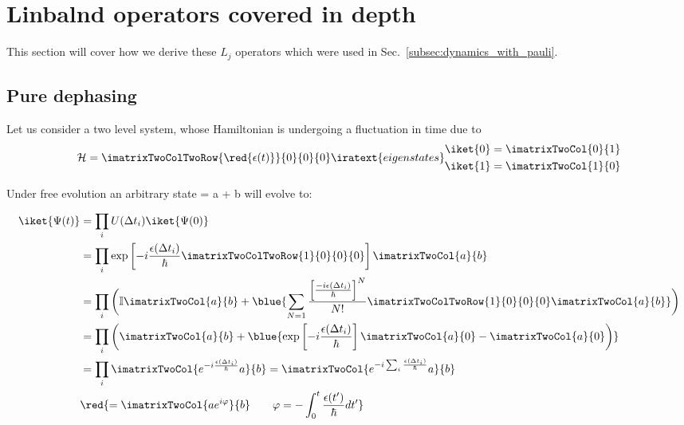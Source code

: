 
\section{Linbalnd operators covered in depth\label{sec:linbland2}}
This section  will cover how  we derive these  $ L_j $  operators which
were used in Sec.~\ref{subsec:dynamics_with_pauli}.
\subsection{Pure dephasing\label{sec:lin_1}}
Let us consider  a two level system, whose Hamiltonian  is undergoing a
fluctuation in time due to 
\begin{equation}\label{eq:lin_2}
  \mathcal{H} = \imatrixTwoColTwoRow{\red{\epsilon(t)}}{0}{0}{0} \iratext{eigenstates}
  \begin{aligned}
    \iket{0}     &     =     \imatrixTwoCol{0}{1}\\\iket{1}     &     =
    \imatrixTwoCol{1}{0}
  \end{aligned}
\end{equation}

\noindent  Under  free  evolution  an  arbitrary  state    =
a + b will evolve to:

\begin{equation}\label{eq:lin_3}
  \begin{aligned}
    \iket{\Psi(t)} & = \prod_i U(\Delta t_i) \iket{\Psi(0)} \\
    & = \prod_i \exp\left[-i\frac{\epsilon(\Delta t_i)}{\hbar} \imatrixTwoColTwoRow{1}{0}{0}{0}\right]\imatrixTwoCol{a}{b}\\
    & = \prod_i \bigg(\mathbb{I}\imatrixTwoCol{a}{b} + \blue{\sum_{{N = 1}}\frac{\left[\frac{-i\epsilon(\Delta t_i)}{\hbar}\right]^N}{N!} \imatrixTwoColTwoRow{1}{0}{0}{0}\imatrixTwoCol{a}{b}}\bigg)\\
    & = \prod_i \bigg(\imatrixTwoCol{a}{b} + \blue{\exp\left[-i\frac{\epsilon(\Delta t_i)}{\hbar}\right]\imatrixTwoCol{a}{0} - \imatrixTwoCol{a}{0}\bigg)}\\
    & = \prod_i \imatrixTwoCol{e^{-i\frac{\epsilon(\Delta t_i)}{\hbar}}a}{b} = \imatrixTwoCol{e^{-i\sum_i\frac{\epsilon(\Delta t_i)}{\hbar}}a}{b} \\
    &     \red{=     \imatrixTwoCol{ae^{i\varphi}}{b}     \qquad     \varphi     =
      -\int_{0}^{t}\frac{\epsilon(t')}{\hbar}dt'}
  \end{aligned}
\end{equation}


